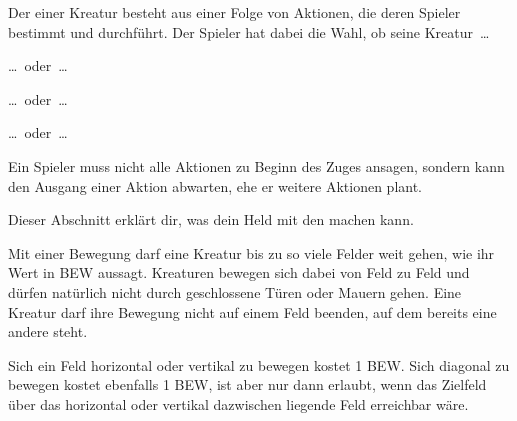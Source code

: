 {		Der  einer Kreatur besteht aus einer Folge von Aktionen, die deren Spieler bestimmt und durchführt. Der Spieler hat dabei die Wahl, ob seine Kreatur~\ldots


		{\centering\ldots~oder~\ldots}


		{\centering\ldots~oder~\ldots}


		{\centering\ldots~oder~\ldots}


		\noindent
		Ein Spieler muss nicht alle Aktionen zu Beginn des Zuges ansagen, sondern kann den Ausgang einer Aktion abwarten, ehe er weitere Aktionen plant.



		\noindent
		Dieser Abschnitt erklärt dir, was dein Held mit den  machen kann.

			Mit einer Bewegung darf eine Kreatur bis zu so viele Felder weit gehen, wie ihr Wert in BEW aussagt. Kreaturen bewegen sich dabei von Feld zu Feld und dürfen natürlich nicht durch geschlossene Türen oder Mauern gehen. Eine Kreatur darf ihre Bewegung nicht auf einem Feld beenden, auf dem bereits eine andere steht.

			Sich ein Feld horizontal oder vertikal zu bewegen kostet 1 BEW. Sich diagonal zu bewegen kostet ebenfalls 1 BEW, ist aber nur dann erlaubt, wenn das Zielfeld über das horizontal oder vertikal dazwischen liegende Feld erreichbar wäre.

}
